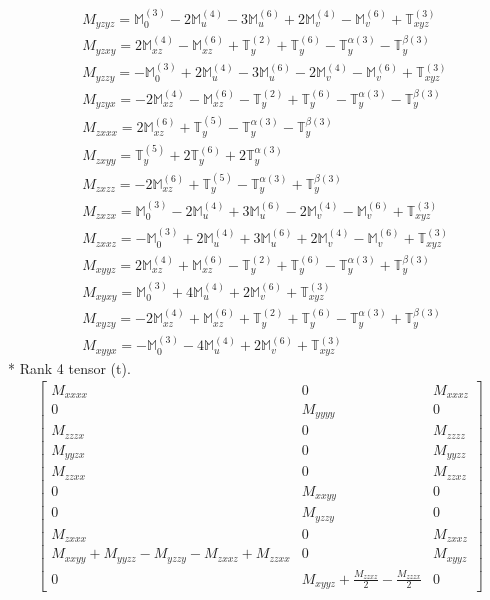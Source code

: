 \documentclass[fleqn,8pt,landscape]{jsarticle}
\begin{document}
\begin{align*}
& M_{yzyz} = \mathbb{M}_{0}^{(3)} - 2 \mathbb{M}_{u}^{(4)} - 3 \mathbb{M}_{u}^{(6)} + 2 \mathbb{M}_{v}^{(4)} - \mathbb{M}_{v}^{(6)} + \mathbb{T}_{xyz}^{(3)} \\
& M_{yzxy} = 2 \mathbb{M}_{xz}^{(4)} - \mathbb{M}_{xz}^{(6)} + \mathbb{T}_{y}^{(2)} + \mathbb{T}_{y}^{(6)} - \mathbb{T}_{y}^{\alpha(3)} - \mathbb{T}_{y}^{\beta(3)} \\
& M_{yzzy} = - \mathbb{M}_{0}^{(3)} + 2 \mathbb{M}_{u}^{(4)} - 3 \mathbb{M}_{u}^{(6)} - 2 \mathbb{M}_{v}^{(4)} - \mathbb{M}_{v}^{(6)} + \mathbb{T}_{xyz}^{(3)} \\
& M_{yzyx} = - 2 \mathbb{M}_{xz}^{(4)} - \mathbb{M}_{xz}^{(6)} - \mathbb{T}_{y}^{(2)} + \mathbb{T}_{y}^{(6)} - \mathbb{T}_{y}^{\alpha(3)} - \mathbb{T}_{y}^{\beta(3)} \\
& M_{zxxx} = 2 \mathbb{M}_{xz}^{(6)} + \mathbb{T}_{y}^{(5)} - \mathbb{T}_{y}^{\alpha(3)} - \mathbb{T}_{y}^{\beta(3)} \\
& M_{zxyy} = \mathbb{T}_{y}^{(5)} + 2 \mathbb{T}_{y}^{(6)} + 2 \mathbb{T}_{y}^{\alpha(3)} \\
& M_{zxzz} = - 2 \mathbb{M}_{xz}^{(6)} + \mathbb{T}_{y}^{(5)} - \mathbb{T}_{y}^{\alpha(3)} + \mathbb{T}_{y}^{\beta(3)} \\
& M_{zxzx} = \mathbb{M}_{0}^{(3)} - 2 \mathbb{M}_{u}^{(4)} + 3 \mathbb{M}_{u}^{(6)} - 2 \mathbb{M}_{v}^{(4)} - \mathbb{M}_{v}^{(6)} + \mathbb{T}_{xyz}^{(3)} \\
& M_{zxxz} = - \mathbb{M}_{0}^{(3)} + 2 \mathbb{M}_{u}^{(4)} + 3 \mathbb{M}_{u}^{(6)} + 2 \mathbb{M}_{v}^{(4)} - \mathbb{M}_{v}^{(6)} + \mathbb{T}_{xyz}^{(3)} \\
& M_{xyyz} = 2 \mathbb{M}_{xz}^{(4)} + \mathbb{M}_{xz}^{(6)} - \mathbb{T}_{y}^{(2)} + \mathbb{T}_{y}^{(6)} - \mathbb{T}_{y}^{\alpha(3)} + \mathbb{T}_{y}^{\beta(3)} \\
& M_{xyxy} = \mathbb{M}_{0}^{(3)} + 4 \mathbb{M}_{u}^{(4)} + 2 \mathbb{M}_{v}^{(6)} + \mathbb{T}_{xyz}^{(3)} \\
& M_{xyzy} = - 2 \mathbb{M}_{xz}^{(4)} + \mathbb{M}_{xz}^{(6)} + \mathbb{T}_{y}^{(2)} + \mathbb{T}_{y}^{(6)} - \mathbb{T}_{y}^{\alpha(3)} + \mathbb{T}_{y}^{\beta(3)} \\
& M_{xyyx} = - \mathbb{M}_{0}^{(3)} - 4 \mathbb{M}_{u}^{(4)} + 2 \mathbb{M}_{v}^{(6)} + \mathbb{T}_{xyz}^{(3)}
\end{align*}
* Rank 4 tensor (t).
\begin{align*}
\begin{bmatrix} M_{xxxx} & 0 & M_{xxxz} \\ 0 & M_{yyyy} & 0 \\ M_{zzzx} & 0 & M_{zzzz} \\ M_{yyzx} & 0 & M_{yyzz} \\ M_{zzxx} & 0 & M_{zzxz} \\ 0 & M_{xxyy} & 0 \\ 0 & M_{yzzy} & 0 \\ M_{zxxx} & 0 & M_{zxxz} \\ M_{xxyy} + M_{yyzz} - M_{yzzy} - M_{zxxz} + M_{zzxx} & 0 & M_{xyyz} \\ 0 & M_{xyyz} + \frac{M_{zzxz}}{2} - \frac{M_{zzzx}}{2} & 0 \end{bmatrix}
\end{align*}
\end{document}
